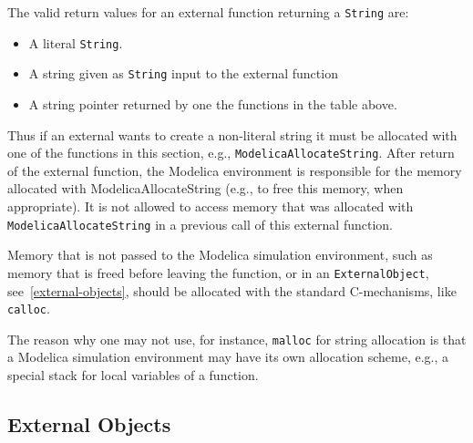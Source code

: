 The valid return values for an external function returning a \lstinline!String! are:
\begin{itemize}
\item A literal \lstinline!String!.
\item A string given as \lstinline!String! input to the external function
\item A string pointer returned by one the functions in the table above.
\end{itemize}

Thus if an external wants to create a non-literal string it must be allocated with one of the functions in
this section, e.g., \lstinline!ModelicaAllocateString!.
After return of the external function, the Modelica
environment is responsible for the memory allocated with
ModelicaAllocateString (e.g., to free this memory, when appropriate). It
is not allowed to access memory that was allocated with
\lstinline!ModelicaAllocateString! in a previous call of this external function.

\begin{nonnormative}
Memory that is not passed to the Modelica simulation environment, such as memory that is freed before leaving the function, or in an \lstinline!ExternalObject!,
see~\autoref{external-objects}, should be allocated with the standard C-mechanisms, like \lstinline[language=C]!calloc!.
\end{nonnormative}

\begin{nonnormative}
The reason why one may not use, for instance, \lstinline[language=C]!malloc! for string allocation is that a Modelica simulation environment may have
its own allocation scheme, e.g., a special stack for local variables of a function.
\end{nonnormative}

\subsection{External Objects}

